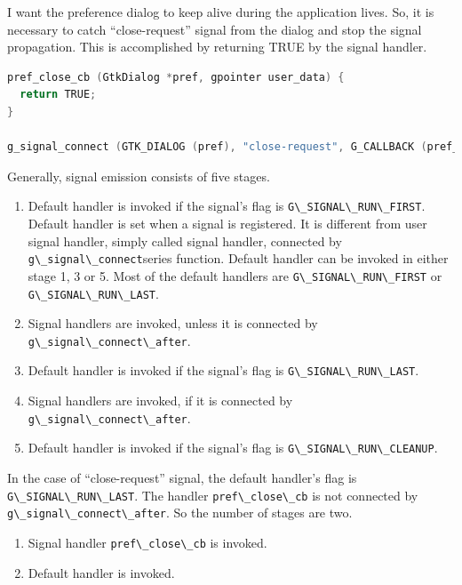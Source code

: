 I want the preference dialog to keep alive during the application lives.
So, it is necessary to catch ``close-request'' signal from the dialog
and stop the signal propagation. This is accomplished by returning TRUE
by the signal handler.

\begin{lstlisting}[language=C]
pref_close_cb (GtkDialog *pref, gpointer user_data) {
  return TRUE;
}

g_signal_connect (GTK_DIALOG (pref), "close-request", G_CALLBACK (pref_close_cb), NULL);
\end{lstlisting}

Generally, signal emission consists of five stages.

\begin{enumerate}
\def\labelenumi{\arabic{enumi}.}
\tightlist
\item
  Default handler is invoked if the signal's flag is
  \passthrough{\lstinline!G\_SIGNAL\_RUN\_FIRST!}. Default handler is
  set when a signal is registered. It is different from user signal
  handler, simply called signal handler, connected by
  \passthrough{\lstinline!g\_signal\_connect!}series function. Default
  handler can be invoked in either stage 1, 3 or 5. Most of the default
  handlers are \passthrough{\lstinline!G\_SIGNAL\_RUN\_FIRST!} or
  \passthrough{\lstinline!G\_SIGNAL\_RUN\_LAST!}.
\item
  Signal handlers are invoked, unless it is connected by
  \passthrough{\lstinline!g\_signal\_connect\_after!}.
\item
  Default handler is invoked if the signal's flag is
  \passthrough{\lstinline!G\_SIGNAL\_RUN\_LAST!}.
\item
  Signal handlers are invoked, if it is connected by
  \passthrough{\lstinline!g\_signal\_connect\_after!}.
\item
  Default handler is invoked if the signal's flag is
  \passthrough{\lstinline!G\_SIGNAL\_RUN\_CLEANUP!}.
\end{enumerate}

In the case of ``close-request'' signal, the default handler's flag is
\passthrough{\lstinline!G\_SIGNAL\_RUN\_LAST!}. The handler
\passthrough{\lstinline!pref\_close\_cb!} is not connected by
\passthrough{\lstinline!g\_signal\_connect\_after!}. So the number of
stages are two.

\begin{enumerate}
\def\labelenumi{\arabic{enumi}.}
\tightlist
\item
  Signal handler \passthrough{\lstinline!pref\_close\_cb!} is invoked.
\item
  Default handler is invoked.
\end{enumerate}

